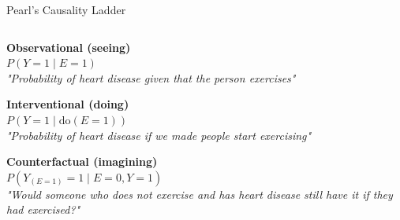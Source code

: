 \documentclass[onlytextwidth,english]{beamer}\usepackage[]{graphicx}\usepackage[]{xcolor}
\begin{document}
\begin{frame}{Pearl's Causality Ladder}

\begin{columns}

\begin{column}{0.60\textwidth}

\textbf{Observational (seeing)} \\
$P(Y=1 \mid E=1)$ \\
{\footnotesize \textit{"Probability of heart disease given that the person exercises"}}

\vspace{0.4cm}

\textbf{Interventional (doing)} \\
$P(Y=1 \mid \text{do}(E=1))$ \\
{\footnotesize \textit{"Probability of heart disease if we made people start exercising"}} 

\vspace{0.4cm}

\textbf{Counterfactual (imagining)} \\
 $P(Y_{(E=1)} = 1 \mid E=0, Y=1)$ \\
{\footnotesize \textit{"Would someone who does not exercise and has heart disease still have it if they had exercised?"}}

\end{column}


\end{columns}
\end{frame}
\end{document}
